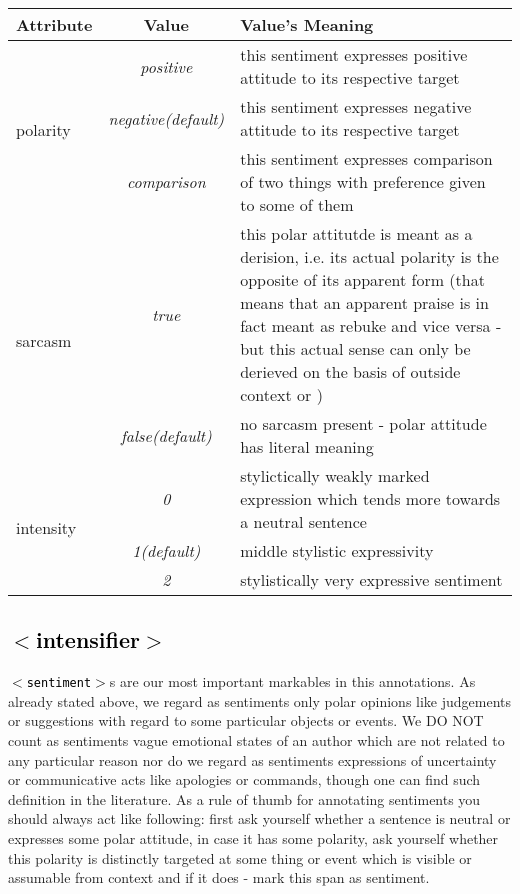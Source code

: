 \documentclass[11pt,a4paper]{article}
\newcommand{\xmltag}[1]{\textcolor{black}{{\small$<$#1$>$}}}
\begin{document}
\begin{tabular}{|l|c|p{}|}\hline
  Attribute & Value & Value's Meaning\\\hline

  \multirow{3}{*}{polarity} & \textit{positive} & this sentiment
  expresses positive attitude to its respective target\\\cline{2-3}

  & \textit{negative\newline(default)} & this sentiment
  expresses negative attitude to its respective target\\\cline{2-3}

  & \textit{comparison} & this sentiment expresses comparison of two
  things with preference given to some of them\\\hline


  \multirow{2}{*}{sarcasm} & \textit{true} & this polar attitutde is
  meant as a derision, i.e. its actual polarity is the opposite of its
  apparent form (that means that an apparent praise is in fact meant
  as rebuke and vice versa - but this actual sense can only be
  derieved on the basis of outside context or )\\\cline{2-3}

  & \textit{false\newline(default)} & no sarcasm present - polar
  attitude has literal meaning\\\hline

  \multirow{3}{*}{intensity} & \textit{0} & stylictically weakly
  marked expression which tends more towards a neutral
  sentence\\\cline{2-3}

  & \textit{1\newline(default)} & middle stylistic
  expressivity\\\cline{2-3}

  & \textit{2} & stylistically very expressive sentiment\\\hline
\end{tabular}

\subsection{\xmltag{intensifier}}
\texttt{\xmltag{sentiment}}s are our most important markables in this
annotations. As already stated above, we regard as sentiments only
polar opinions like judgements or suggestions with regard to some
particular objects or events. We DO NOT count as sentiments vague
emotional states of an author which are not related to any particular
reason nor do we regard as sentiments expressions of uncertainty or
communicative acts like apologies or commands, though one can find
such definition in the literature. As a rule of thumb for annotating
sentiments you should always act like following: first ask yourself
whether a sentence is neutral or expresses some polar attitude, in
case it has some polarity, ask yourself whether this polarity is
distinctly targeted at some thing or event which is visible or
assumable from context and if it does - mark this span as sentiment.
\end{document}
